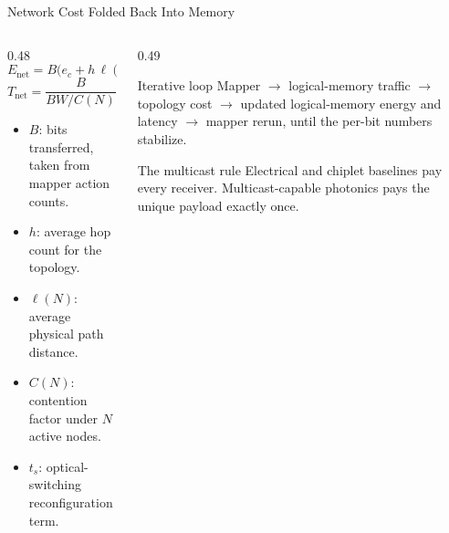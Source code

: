 \documentclass[10pt,aspectratio=169]{beamer}
\newenvironment{tightitemize}{\begin{itemize}\setlength{\itemsep}{4pt}\setlength{\parskip}{0pt}}{\end{itemize}}
\begin{document}
\begin{frame}{Network Cost Folded Back Into Memory}
  \begin{columns}[T,onlytextwidth]
    \begin{column}{0.48\textwidth}
      \[
      E_{\text{net}}=B\bigl(e_c+h\,\ell(N)\,e_{tx}\bigr)
      \]
      \[
      T_{\text{net}}=\frac{B}{BW/C(N)}+h\,t_r+h\,\ell(N)\,t_p+t_s
      \]
      \begin{tightitemize}
        \item $B$: bits transferred, taken from mapper action counts.
        \item $h$: average hop count for the topology.
        \item $\ell(N)$: average physical path distance.
        \item $C(N)$: contention factor under $N$ active nodes.
        \item $t_s$: optical-switching reconfiguration term.
      \end{tightitemize}
    \end{column}
    \begin{column}{0.49\textwidth}
      \begin{block}{Iterative loop}
      Mapper $\rightarrow$ logical-memory traffic $\rightarrow$ topology cost $\rightarrow$ updated logical-memory energy and latency $\rightarrow$ mapper rerun, until the per-bit numbers stabilize.
      \end{block}
      \begin{block}{The multicast rule}
      Electrical and chiplet baselines pay every receiver. Multicast-capable photonics pays the unique payload exactly once.
      \end{block}
    \end{column}
  \end{columns}
\end{frame}
\end{document}
